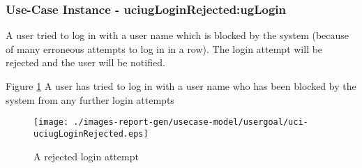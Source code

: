 
	\subsubsection{Use-Case Instance - uciugLoginRejected:ugLogin}
	
	A user tried to log in with a user name which is blocked by the system (because of many erroneous attempts to log in in a row). The login attempt will be rejected and the user will be notified.		  
	\begin{operationmodel}
	
	\end{operationmodel} 

	
	Figure \ref{fig:lu.uni.lassy.excalibur.examples.icrash-RE-UC-uci-uciugLoginRejected}
	A user has tried to log in with a user name who has been blocked by the system from any further login attempts
	
	\begin{figure}[htbp]
	\begin{center}
	
	\texttt{[image: ./images-report-gen/usecase-model/usergoal/uci-uciugLoginRejected.eps]}
	\end{center}
	\caption[lu.uni.lassy.excalibur.examples.icrash Sequence Diagram: uci-uciugLoginRejected]{A rejected login attempt}
	\label{fig:lu.uni.lassy.excalibur.examples.icrash-RE-UC-uci-uciugLoginRejected}
	\end{figure}
	\vspace{0.5cm}

